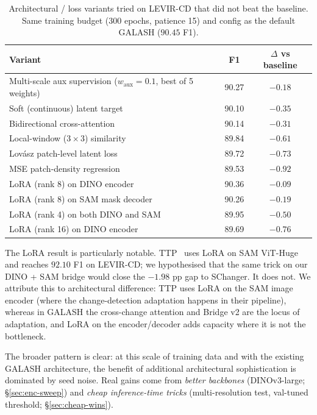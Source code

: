 \begin{table}[h]
  \centering
  \small
  \caption{Architectural / loss variants tried on LEVIR-CD that did not
    beat the baseline. Same training budget (300 epochs, patience 15)
    and config as the default GALASH ($90.45$ F1).}
  \label{tab:negative}
  \begin{tabular}{lcc}
    \toprule
    Variant & F1 & $\Delta$ vs baseline \\
    \midrule
    Multi-scale aux supervision ($w_\text{aux}{=}0.1$, best of 5 weights) & 90.27 & $-0.18$ \\
    Soft (continuous) latent target & 90.10 & $-0.35$ \\
    Bidirectional cross-attention & 90.14 & $-0.31$ \\
    Local-window ($3{\times}3$) similarity & 89.84 & $-0.61$ \\
    Lov\'asz patch-level latent loss & 89.72 & $-0.73$ \\
    MSE patch-density regression & 89.53 & $-0.92$ \\
    \midrule
    LoRA (rank 8) on DINO encoder                & 90.36 & $-0.09$ \\
    LoRA (rank 8) on SAM mask decoder            & 90.26 & $-0.19$ \\
    LoRA (rank 4) on both DINO and SAM           & 89.95 & $-0.50$ \\
    LoRA (rank 16) on DINO encoder               & 89.69 & $-0.76$ \\
    \bottomrule
  \end{tabular}
\end{table}

The LoRA result is particularly notable. TTP~\citep{chen2024ttp} uses LoRA
on SAM ViT-Huge and reaches $92.10$ F1 on LEVIR-CD; we hypothesised that
the same trick on our DINO + SAM bridge would close the $-1.98$ pp gap to
SChanger. It does not. We attribute this to architectural difference: TTP
uses LoRA on the SAM image encoder (where the change-detection adaptation
happens in their pipeline), whereas in GALASH the cross-change attention
and Bridge v2 are the locus of adaptation, and LoRA on the encoder/decoder
adds capacity where it is not the bottleneck.

The broader pattern is clear: at this scale of training data and with the
existing GALASH architecture, the benefit of additional architectural
sophistication is dominated by seed noise. Real gains come from
\emph{better backbones} (DINOv3-large; \S\ref{sec:enc-sweep}) and
\emph{cheap inference-time tricks} (multi-resolution test, val-tuned
threshold; \S\ref{sec:cheap-wins}).

